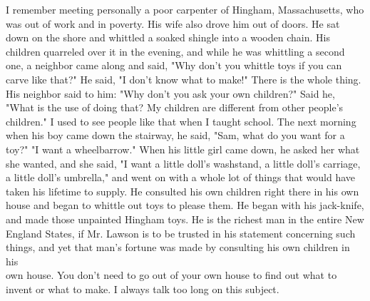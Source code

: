 \documentclass[10pt]{article}
\begin{document}
I remember meeting personally a poor carpenter of Hingham, Massachusetts, who was out of work and in poverty. His wife also drove him out of doors. He sat down on the shore and whittled a soaked shingle into a wooden chain. His children quarreled over it in the evening, and while he was whittling a second one, a neighbor came along and said, "Why don't you whittle toys if you can carve like that?" He said, "I don't know what to make!" There is the whole thing. His neighbor said to him: "Why don't you ask your own children?" Said he, "What is the use of doing that? My children are different from other people's children." I used to see people like that when I taught school. The next morning when his boy came down the stairway, he said, "Sam, what do you want for a toy?" "I want a wheelbarrow." When his little girl came down, he asked her what she wanted, and she said, "I want a little doll's washstand, a little doll's carriage, a little doll's umbrella," and went on with a whole lot of things that would have taken his lifetime to supply. He consulted his own children right there in his own house and began to whittle out toys to please them. He began with his jack-knife, and made those unpainted Hingham toys. He is the richest man in the entire New England States, if Mr. Lawson is to be trusted in his statement concerning such things, and yet that man's fortune was made by consulting his own children in his\\
own house. You don't need to go out of your own house to find out what to invent or what to make. I always talk too long on this subject.
\end{document}
